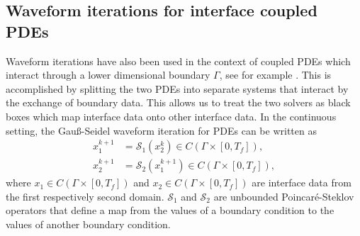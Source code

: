 \subsection{Waveform iterations for interface coupled PDEs}
Waveform iterations have also been used in the context of coupled PDEs which interact through a lower dimensional boundary $\Gamma$, see for example \cite{JaVa96a, JaVa96b, RuUe21, BiMo19, BiMeMo23, gakwma:16}. This is accomplished by splitting the two PDEs into separate systems that interact by the exchange of boundary data. This allows us to treat the two solvers as black boxes which map interface data onto other interface data. In the continuous setting, the Gau\ss-Seidel waveform iteration for PDEs can be written as
\begin{align*}
	x_1^{k+1} & = \mathcal{S}_1( x_2^{k}) \in C\left(\Gamma \times [0,T_f]\right), \\
	x_2^{k+1} & = \mathcal{S}_2(x_1^{k+1}) \in C\left(\Gamma \times [0,T_f]\right) ,
\end{align*}
where $x_1 \in C\left(\Gamma \times [0,T_f]\right)$ and $x_2 \in C\left(\Gamma \times [0,T_f]\right)$ are interface data from the first respectively second domain. $\mathcal{S}_1$ and $\mathcal{S}_2$ are unbounded Poincaré-Steklov operators that define a map from the values of a boundary condition to the values of another boundary condition. 

